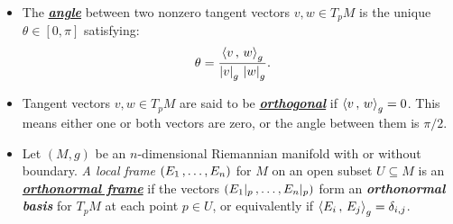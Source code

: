 \documentclass[11pt]{article}
\begin{document}
\begin{itemize}
\item \begin{definition}
The \underline{\emph{\textbf{angle}}} between two nonzero tangent vectors $v, w \in T_{p}M$ is the unique $\theta \in [0, \pi]$ satisfying:
\begin{align*}
\theta &= \frac{\left\langle v\,,\, w \right\rangle_g}{\left\lvert v \right\rvert_g \, \left\lvert w \right\rvert_g}.
\end{align*}
\end{definition}

\item \begin{definition}
Tangent vectors $v, w \in T_{p}M$ are said to be \underline{\emph{\textbf{orthogonal}}} if $\left\langle v\,,\, w \right\rangle_g = 0$. This means either one or both vectors are zero, or the angle between them is $\pi/2$.
\end{definition}

\item \begin{definition}
Let $(M, g)$ be an $n$-dimensional Riemannian manifold with or without boundary. \emph{A local frame} $(E_1 \,{,}\ldots{,}\, E_n)$ for $M$ on an open subset $U \subseteq M$ is an \underline{\emph{\textbf{orthonormal frame}}} if the vectors $(E_1|_{p} \,{,}\ldots{,}\, E_n|_{p})$ form an \emph{\textbf{orthonormal basis}} for $T_{p}M$ at each point $p \in U$, or
equivalently if $\left\langle E_i\,,\, E_j \right\rangle_g = \delta_{i,j}$.
\end{definition}
\end{itemize}
\end{document}
